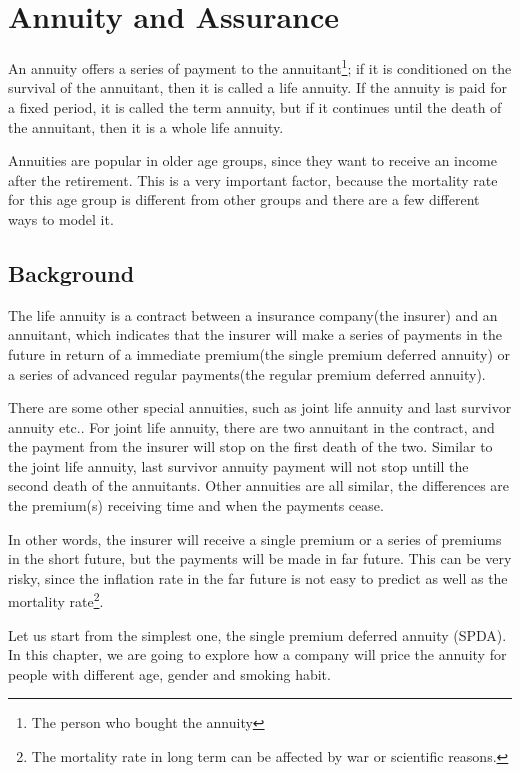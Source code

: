 \documentclass{report}
\begin{document}
\chapter{Annuity and Assurance}    \label{annuity}

An annuity offers a series of payment to the annuitant\footnote{The person who bought the annuity}; if it is conditioned on the survival of the annuitant, then it is called a life annuity. If the annuity is paid for a fixed period, it is called the term annuity, but if it continues until the death of the annuitant, then it is a whole life annuity.


Annuities are popular in older age groups, since they want to receive an income after the retirement. This is a very important factor, because the mortality rate for this age group is different from other groups and there are a few different ways to model it. 


\section{Background}

The life annuity is a contract between a insurance company(the insurer) and an annuitant\cite{bib:annuity-def}, which indicates that the insurer will make a series of payments in the future in return of a immediate premium(the single premium deferred annuity) or a series of advanced regular payments(the regular premium deferred annuity). 


There are some other special annuities, such as joint life annuity and last survivor annuity etc.. For joint life annuity, there are two annuitant in the contract, and the payment from the insurer will stop on the first death of the two. Similar to the joint life annuity, last survivor annuity payment will not stop untill the second death of the annuitants. Other annuities are all similar, the differences are the premium(s) receiving time and when the payments cease. 


In other words, the insurer will receive a single premium or a series of premiums in the short future, but the payments will be made in far future. This can be very risky, since the inflation rate in the far future is not easy to predict as well as the mortality rate\footnote{The mortality rate in long term can be affected by war or scientific reasons.}.

Let us start from the simplest one, the single premium deferred annuity (SPDA). In this chapter, we are going to explore how a company will price the annuity for people with different age, gender and smoking habit.
\end{document}
